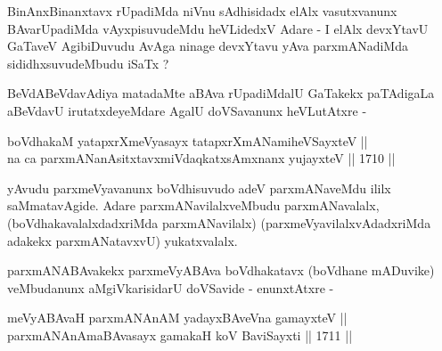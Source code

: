 \begin{artha}
BinAnxBinanxtavx rUpadiMda niVnu sAdhisidadx elAlx vasutxvanunx
BAvarUpadiMda vAyxpisuvudeMdu heVLidedxV Adare - I elAlx devxYtavU
GaTaveV AgibiDuvudu AvAga ninage  devxYtavu yAva parxmANadiMda
sididhxsuvudeMbudu iSaTx ?
\end{artha}

\begin{artha}
BeVdABeVdavAdiya matadaMte aBAva rUpadiMdalU GaTakekx paTAdigaLa
aBeVdavU irutatxdeyeMdare AgalU doVSavanunx heVLutAtxre - 
\end{artha}

\begin{shl}
\footnotemark[1]boVdhakaM yatapxrXmeVyasayx tatapxrXmANamiheVSayxteV || \\
na ca parxmANanAsitxtavxmiVdaqkatxsAmxnanx yujayxteV ||  1710 ||  
\end{shl}

\begin{artha}
yAvudu parxmeVyavanunx boVdhisuvudo adeV parxmANaveMdu
ililx saMmatavAgide. Adare parxmANavilalxveMbudu parxmANavalalx,
(boVdhakavalalxdadxriMda parxmANavilalx) (parxmeVyavilalxvAdadxriMda
adakekx parxmANatavxvU) yukatxvalalx.
\end{artha}

\begin{artha}
parxmANABAvakekx parxmeVyABAva boVdhakatavx (boVdhane mADuvike)
veMbudanunx aMgiVkarisidarU doVSavide - enunxtAtxre -
\end{artha}

\begin{shl}
\footnotemark[1]meVyABAvaH parxmANAnAM yadayxBAveVna gamayxteV || \\
parxmANAnAmaBAvasayx gamakaH koV BaviSayxti ||  1711 ||  
\end{shl}

